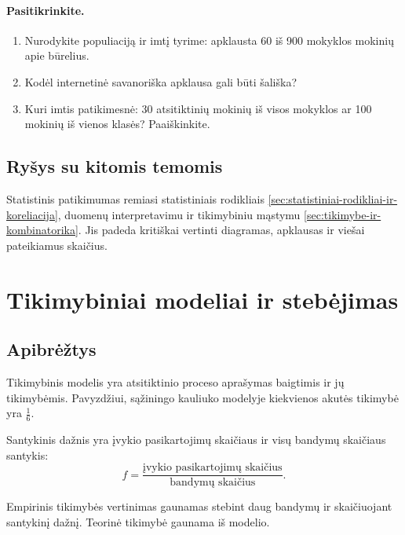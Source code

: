 \paragraph{Pasitikrinkite.}
\begin{enumerate}
\item Nurodykite populiaciją ir imtį tyrime: apklausta 60 iš 900 mokyklos mokinių apie būrelius.
\item Kodėl internetinė savanoriška apklausa gali būti šališka?
\item Kuri imtis patikimesnė: 30 atsitiktinių mokinių iš visos mokyklos ar 100 mokinių iš vienos klasės? Paaiškinkite.
\end{enumerate}

\subsection{Ryšys su kitomis temomis}

Statistinis patikimumas remiasi statistiniais rodikliais \ref{sec:statistiniai-rodikliai-ir-koreliacija}, duomenų interpretavimu ir tikimybiniu mąstymu \ref{sec:tikimybe-ir-kombinatorika}. Jis padeda kritiškai vertinti diagramas, apklausas ir viešai pateikiamus skaičius.

\section{Tikimybiniai modeliai ir stebėjimas}\label{sec:tikimybiniai-modeliai-ir-stebejimas}

\subsection{Apibrėžtys}

\begin{apibreztis}
Tikimybinis modelis yra atsitiktinio proceso aprašymas baigtimis ir jų tikimybėmis. Pavyzdžiui, sąžiningo kauliuko modelyje kiekvienos akutės tikimybė yra $\frac16$.
\end{apibreztis}

\begin{apibreztis}
Santykinis dažnis yra įvykio pasikartojimų skaičiaus ir visų bandymų skaičiaus santykis:
\[
f=\frac{\text{įvykio pasikartojimų skaičius}}{\text{bandymų skaičius}}.
\]
\end{apibreztis}

\begin{apibreztis}
Empirinis tikimybės vertinimas gaunamas stebint daug bandymų ir skaičiuojant santykinį dažnį. Teorinė tikimybė gaunama iš modelio.
\end{apibreztis}


